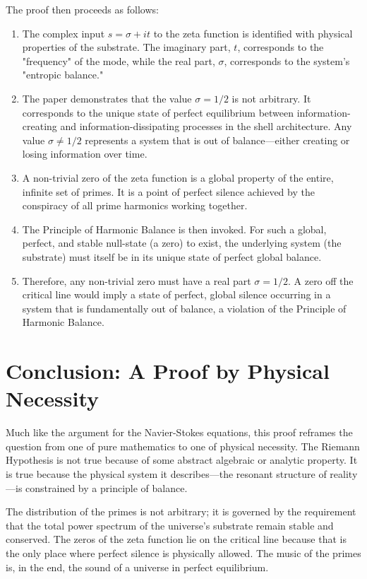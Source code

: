 \documentclass[12pt]{report}
\begin{document}
The proof then proceeds as follows:
\begin{enumerate}
    \item The complex input $s = \sigma + it$ to the zeta function is identified with physical properties of the substrate. The imaginary part, $t$, corresponds to the "frequency" of the mode, while the real part, $\sigma$, corresponds to the system's "entropic balance."
    \item The paper demonstrates that the value $\sigma = 1/2$ is not arbitrary. It corresponds to the unique state of perfect equilibrium between information-creating and information-dissipating processes in the shell architecture. Any value $\sigma \neq 1/2$ represents a system that is out of balance—either creating or losing information over time.
    \item A non-trivial zero of the zeta function is a global property of the entire, infinite set of primes. It is a point of perfect silence achieved by the conspiracy of all prime harmonics working together.
    \item The Principle of Harmonic Balance is then invoked. For such a global, perfect, and stable null-state (a zero) to exist, the underlying system (the substrate) must itself be in its unique state of perfect global balance.
    \item Therefore, any non-trivial zero must have a real part $\sigma = 1/2$. A zero off the critical line would imply a state of perfect, global silence occurring in a system that is fundamentally out of balance, a violation of the Principle of Harmonic Balance.
\end{enumerate}

\section{Conclusion: A Proof by Physical Necessity}
Much like the argument for the Navier-Stokes equations, this proof reframes the question from one of pure mathematics to one of physical necessity. The Riemann Hypothesis is not true because of some abstract algebraic or analytic property. It is true because the physical system it describes—the resonant structure of reality—is constrained by a principle of balance.

The distribution of the primes is not arbitrary; it is governed by the requirement that the total power spectrum of the universe's substrate remain stable and conserved. The zeros of the zeta function lie on the critical line because that is the only place where perfect silence is physically allowed. The music of the primes is, in the end, the sound of a universe in perfect equilibrium.
\end{document}
